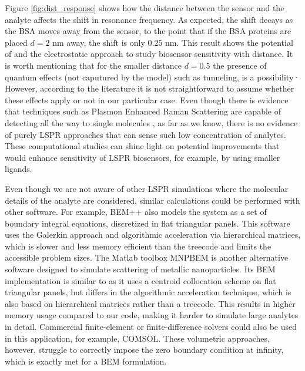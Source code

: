 Figure \ref{fig:dist_response} shows how the distance between the sensor 
and the analyte affects the shift in resonance frequency. As expected, the shift decays 
as the BSA moves away from the sensor, to the point that if the BSA proteins are placed
$d=2$ nm away, the shift is only $0.25$ nm. This result shows the potential of \pygbe 
and the electrostatic approach to study biosensor sensitivity with distance. It is worth
mentioning that for the smaller distance $d=0.5$ the presence of quantum effects (not caputured
 by the model) such as tunneling, is a possibility· However, according to the literature
 \cite{SavageETal2012, EstebanETal2012} it is not straightforward to assume whether these
effects apply or not in our particular case.  
Even though there is evidence that techniques such as Plasmon Enhanced Raman Scattering are capable of detecting all the way to single molecules \cite{ZhangZhangETal2013}, 
as far as we know, there is no evidence of purely LSPR approaches that can sense such low concentration of analytes.
These computational studies can shine light on
potential improvements that would enhance sensitivity of LSPR biosensors, for example, by using
smaller ligands. 

Even though we are not aware of other LSPR simulations where the molecular details of the analyte are considered, similar calculations could be performed with other software. 
For example, BEM++ \cite{SmigajETal2015} also models the system as a set of boundary integral equations, discretized in flat triangular panels. 
This software uses the Galerkin approach and algorithmic acceleration via hierarchical matrices, which is slower and less memory efficient than the treecode and limits the accessible problem sizes.
The Matlab toolbox MNPBEM \cite{HohenesterTrugler2012} is another alternative software designed to simulate scattering of metallic nanoparticles.
Its BEM implementation is similar to \pygbe as it uses a centroid collocation scheme on flat triangular panels, but differs in the algorithmic acceleration technique, which is also based on hierarchical matrices rather than a treecode. 
This results in higher memory usage compared to our code, making it harder to simulate large analytes in detail.
Commercial finite-element or finite-difference solvers could also be used in this application, for example, COMSOL. 
These volumetric approaches, however, struggle to correctly impose the zero boundary condition at infinity, which is exactly met for a BEM formulation.
